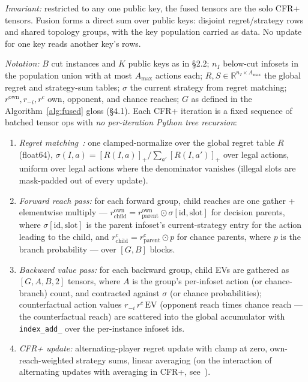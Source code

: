 \documentclass[11pt]{article}
\begin{document}
\emph{Invariant:} restricted to any one public key, the fused tensors are the solo CFR+
tensors. Fusion forms a direct sum over public keys: disjoint regret/strategy rows and
shared topology groups, with the key population carried as data. No update for one key
reads another key's rows.

\emph{Notation:} $B$ cut instances and $K$ public keys as in \S2.2; $n_I$ below-cut
infosets in the population union with at most $A_{\max}$ actions each; $R, S \in
\mathbb{R}^{n_I \times A_{\max}}$ the global regret and strategy-sum tables; $\sigma$
the current strategy from regret matching; $r^{\text{own}}, r_{-i}, r^c$ own, opponent,
and chance reaches; $G$ as defined in the Algorithm~\ref{alg:fused} gloss (\S4.1).
Each CFR+ iteration is a fixed sequence of batched tensor ops with \emph{no
per-iteration Python tree recursion}:

\begin{enumerate}
\item \emph{Regret matching}~\citep{HartMasColell2000}\emph{:} one clamped-normalize
over the global regret table $R$ (float64), $\sigma(I,a) = [R(I,a)]_+ / \sum_{a'}
[R(I,a')]_+$ over legal actions, uniform over legal actions where the denominator
vanishes (illegal slots are mask-padded out of every update).
\item \emph{Forward reach pass:} for each forward group, child reaches are one gather +
elementwise multiply --- $r^{\text{own}}_{\text{child}} = r^{\text{own}}_{\text{parent}}
\odot \sigma[\text{id}, \text{slot}]$ for decision parents, where $\sigma[\text{id},
\text{slot}]$ is the parent infoset's current-strategy entry for the action leading to
the child, and $r^c_{\text{child}} = r^c_{\text{parent}} \odot p$ for chance parents,
where $p$ is the branch probability --- over $[G, B]$ blocks.
\item \emph{Backward value pass:} for each backward group, child EVs are gathered as
$[G, A, B, 2]$ tensors, where $A$ is the group's per-infoset action (or chance-branch)
count, and contracted against $\sigma$ (or chance probabilities); counterfactual action
values $r_{-i}\, r^c\, \mathrm{EV}$ (opponent reach times chance reach --- the
counterfactual reach) are scattered into the global accumulator with
\texttt{index\_add\_} over the per-instance infoset ids.
\item \emph{CFR+ update:} alternating-player regret update with clamp at zero,
own-reach-weighted strategy sums, linear averaging (on the interaction of alternating
updates with averaging in CFR+, see~\citep{BurchMoravcikSchmid2019}).
\end{enumerate}
\end{document}
